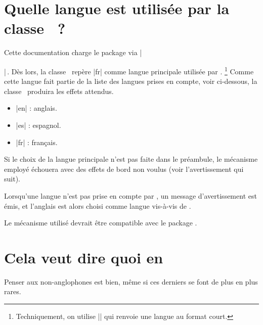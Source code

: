 \section{Quelle langue est utilisée par la classe \thisproj\ ?}

Cette documentation charge le package  via \tdocinlatex|\usepackage[french]{babel}|\,.
Dès lors, la classe \thisproj\ repère \tdocinlatex|fr| comme langue principale utilisée par .%
\footnote{
    Techniquement, on utilise \tdocinlatex|| qui renvoie une langue au format court.
}
Comme cette langue fait partie de la liste des langues prises en compte, voir ci-dessous, la classe \thisproj\ produira les effets attendus.

\begin{multicols}{3}
    \begin{itemize}
        \item \tdocinlatex|en| : anglais.
        \item \tdocinlatex|es| : espagnol.
        \item \tdocinlatex|fr| : français.
    \end{itemize}
\end{multicols}



\begin{tdoccaut}
    Si le choix de la langue principale n'est pas faite dans le préambule, le mécanisme employé échouera avec des effets de bord non voulus (voir l'avertissement qui suit).
\end{tdoccaut}


\begin{tdocwarn}
    Lorsqu'une langue n'est pas prise en compte par \thisproj, un message d'avertissement est émis, et l'anglais est alors choisi comme langue vis-à-vis de \thisproj.
\end{tdocwarn}


\begin{tdocnote}
    Le mécanisme utilisé devrait être compatible avec le package .
\end{tdocnote}


\section{Cela veut dire quoi en }

Penser aux non-anglophones est bien, même si ces derniers se font de plus en plus rares.


